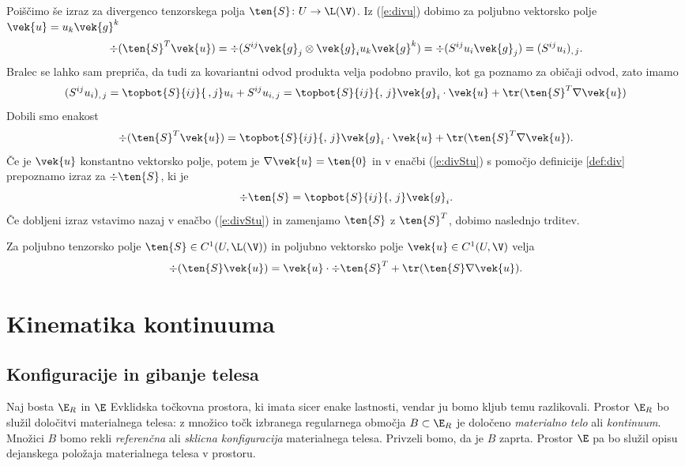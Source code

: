 Poiščimo še izraz za divergenco tenzorskega polja $\ten{S}\colon U\to\L(\V)$.
Iz (\ref{e:divu}) dobimo za poljubno vektorsko polje $\vek{u}=u_k\vek{g}^k$
\[
	\div(\ten{S}^{T}\vek{u})=\div(S^{ij}\vek{g}_j\otimes\vek{g}_i u_k\vek{g}^k)
	=\div(S^{ij}u_i\vek{g}_j)=(S^{ij}u_i)_{,\,j}.
\]
Bralec se lahko sam prepriča, da tudi za kovariantni odvod produkta velja
podobno pravilo, kot ga poznamo za običaji odvod, zato imamo
\[
	(S^{ij}u_i)_{,\,j}=\topbot{S}{ij}{\,,j}u_i+S^{ij}u_{i,\,j}=
	\topbot{S}{ij}{,\,j}\vek{g}_i\cdot\vek{u}+\tr(\ten{S}^{T}\nabla\vek{u})
\]
Dobili smo enakost
\begin{equation} \label{e:divStu}
	\div(\ten{S}^{T}\vek{u})=\topbot{S}{ij}{,\,j}\vek{g}_i\cdot\vek{u}+\tr(\ten{S}^{T}\nabla\vek{u}).
\end{equation}
Če je $\vek{u}$ konstantno vektorsko polje, potem je $\nabla\vek{u}=\ten{0}$ in v
enačbi (\ref{e:divStu}) s pomočjo definicije \ref{def:div} prepoznamo izraz za $\div\ten{S}$, ki je
\[
	\div\ten{S}=\topbot{S}{ij}{,\,j}\vek{g}_i.
\]
Če dobljeni izraz vstavimo nazaj v enačbo (\ref{e:divStu}) in zamenjamo $\ten{S}$ z
$\ten{S}^{T}$, dobimo naslednjo trditev.
\begin{trditev} \label{e:divSu}
	Za poljubno tenzorsko polje $\ten{S}\in C^1(U,\L(\V))$ in poljubno
	vektorsko polje $\vek{u}\in C^1(U,\V)$ velja
	\[ \div(\ten{S}\vek{u})=\vek{u}\cdot\div\ten{S}^{T}+\tr(\ten{S}\nabla\vek{u}). \]
\end{trditev}



\section{Kinematika kontinuuma} \label{chp:kinkon}


\subsection{Konfiguracije in gibanje telesa}


Naj bosta $\E_R$ in $\E$ Evklidska točkovna prostora, ki imata sicer enake lastnosti,
vendar ju bomo kljub temu razlikovali. Prostor $\E_R$ bo služil določitvi materialnega
telesa: z množico točk izbranega regularnega območja $B\subset\E_R$ je določeno \emph{materialno
telo} ali \emph{kontinuum}. Množici $B$ bomo rekli \emph{referenčna} ali \emph{sklicna konfiguracija}
materialnega telesa. Privzeli bomo, da je $B$ zaprta.
Prostor $\E$ pa bo služil opisu dejanskega položaja materialnega telesa v prostoru.

